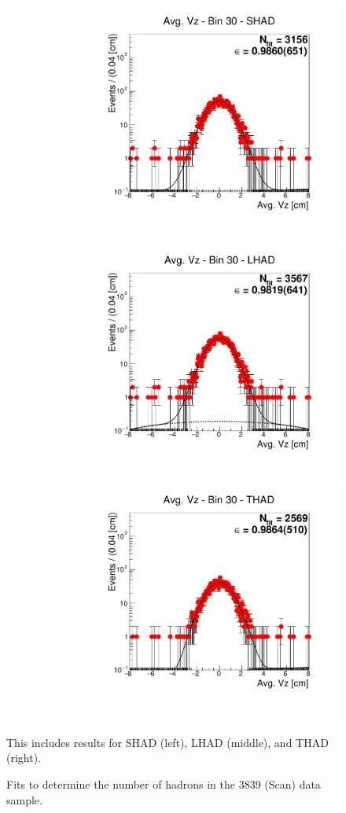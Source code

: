 \begin{figure}[H]
\centering
\includegraphics[scale=0.25]{figures/plots/nonDDbar_fit_results/scan/fit_scan_30_data_SHAD.pdf}
\hspace{-0.5cm}
\includegraphics[scale=0.25]{figures/plots/nonDDbar_fit_results/scan/fit_scan_30_data_LHAD.pdf}
\hspace{-0.5cm}
\includegraphics[scale=0.25]{figures/plots/nonDDbar_fit_results/scan/fit_scan_30_data_THAD.pdf}
\caption{Fits to determine the number of hadrons in the 3839 (Scan) data sample.}
{This includes results for SHAD (left), LHAD (middle), and THAD (right).}
\label{fig:hadron_fits_scan_30}
\end{figure}

